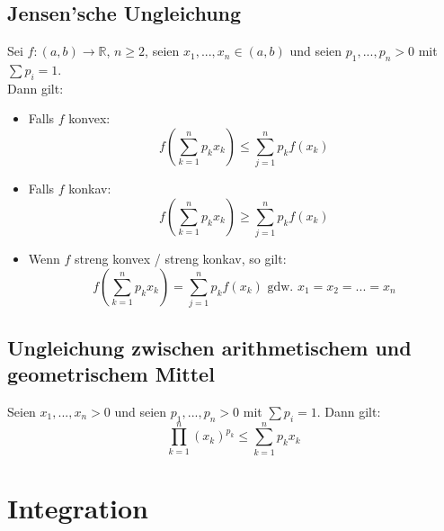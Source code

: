 \documentclass[halfparscip]{scrartcl}
\newcounter{subsection2}
\begin{document}
\subsection*{Jensen'sche Ungleichung}
Sei $f : (a,b) \rightarrow \mathbb{R}$, $n \geq 2$, seien $x_1, ..., x_n \in (a,b)$ und seien $p_1, ..., p_n > 0$ mit $\sum p_i = 1$.\\
Dann gilt:
\begin{itemize}
	\item Falls $f$ konvex:
	\begin{equation*}
	f\left(\sum_{k=1}^{n}p_kx_k\right) \leq \sum_{j=1}^{n}p_kf(x_k)
	\end{equation*}
	\item Falls $f$ konkav:
	\begin{equation*}
	f\left(\sum_{k=1}^{n}p_kx_k\right) \geq \sum_{j=1}^{n}p_kf(x_k)
	\end{equation*}
	\item Wenn $f$ streng konvex / streng konkav, so gilt:
	\begin{equation*}
	f\left(\sum_{k=1}^{n}p_kx_k\right) = \sum_{j=1}^{n}p_kf(x_k) \text{ gdw. } x_1 = x_2 = ... = x_n
	\end{equation*}
\end{itemize}

\subsection*{Ungleichung zwischen arithmetischem und geometrischem Mittel}
Seien $x_1,...,x_n > 0$ und seien $p_1, ..., p_n > 0$ mit $\sum p_i = 1$. Dann gilt:
\begin{equation*}
	\prod_{k=1}^{n}(x_k)^{p_k} \leq \sum_{k=1}^{n}p_kx_k
\end{equation*}

\newpage
\section{Integration}
\end{document}
